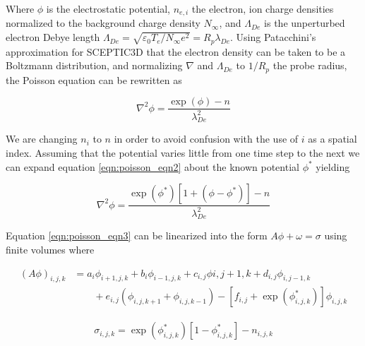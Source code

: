 Where $\phi$ is the electrostatic potential, $n_{e,i}$ the electron, ion charge densities normalized to the background charge density $N_\infty$, and $\Lambda_{De}$ is the unperturbed electron Debye length $\Lambda_{De} = \sqrt{\varepsilon_0T_e/N_\infty e^2} = R_p\lambda_{De}$. Using Patacchini's approximation\cite{Patacchini2010} for SCEPTIC3D that the electron density can be taken to be a Boltzmann distribution, and normalizing $\nabla$ and $\Lambda_{De}$ to $1/R_p$ the probe radius, the Poisson equation can be rewritten as 

\begin{equation}
\nabla^2\phi=\frac{\exp{(\phi)}-n}{\lambda_{De}^2}
\label{eqn:poisson_eqn2}
\end{equation}

We are changing $n_i$ to $n$ in order to avoid confusion with the use of $i$ as a spatial index. Assuming that the potential varies little from one time step to the next we can expand equation \ref{eqn:poisson_eqn2} about the known potential $\phi^*$ yielding
   
\begin{equation}
\nabla^2\phi=\frac{\exp{(\phi^*)}[1+(\phi-\phi^*)]-n}{\lambda_{De}^2}
\label{eqn:poisson_eqn3}
\end{equation}

Equation \ref{eqn:poisson_eqn3} can be linearized into the form $A\phi+\omega = \sigma$ using finite volumes where


\begin{align}
(A\phi)_{i,j,k} &= a_{i}\phi_{i+1,j,k}
		  +b_{i}\phi_{i-1,j,k}
		  +c_{i,j}\phi{i,j+1,k}
		  +d_{i,j}\phi_{i,j-1,k} \nonumber \\
		  &\qquad{} +e_{i,j}(\phi_{i,j,k+1}+\phi_{i,j,k-1})
		  -[f_{i,j} + \exp{(\phi_{i,j,k}^*)}]\phi_{i,j,k}
\label{eqn:psolve}
\end{align}


\vspace{-1.5cm}
\begin{align}
\sigma_{i,j,k} = \exp{(\phi_{i,j,k}^*)}[1-\phi_{i,j,k}^*]-n_{i,j,k}
\label{eqn:psolve_sigma}
\end{align}

